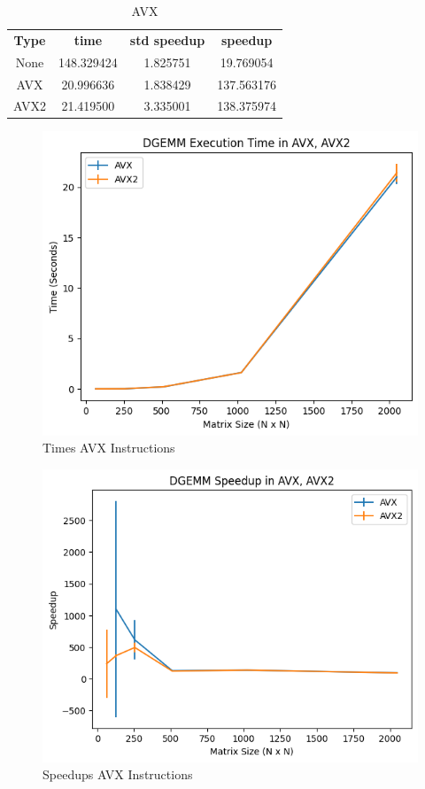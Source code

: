\documentclass[12pt]{article}
\begin{document}
\begin{table}[h]
    \centering
    \label{tab:avx}
    \begin{tabular}{cccc}
        \textbf{Type} & \textbf{time} & \textbf{std speedup} & \textbf{speedup} \\
        None & 148.329424 & 1.825751 & 19.769054 \\
        AVX &	20.996636	 &	1.838429 &	137.563176\\
        AVX2 &	21.419500	 &	3.335001 &	138.375974\\
    \end{tabular}
    \caption{AVX}
\end{table}

\begin{figure}[h]
    \centering
    \includegraphics[scale=0.6]{figures/times_avx.png}
    \caption{Times AVX Instructions}
    \label{fig:times-avx}
\end{figure}

\begin{figure}[h]
    \centering
    \includegraphics[scale=0.6]{figures/speedups_avx.png}
    \caption{Speedups AVX Instructions}
    \label{fig:speedups-avx}
\end{figure}
\end{document}
